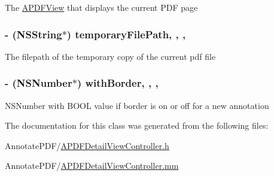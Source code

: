 The \hyperlink{interface_a_p_d_f_view}{A\-P\-D\-F\-View} that displays the current P\-D\-F page \hypertarget{interface_a_p_d_f_detail_view_controller_a7e73dd19df5ed6dedebde35c9901a164}{
\subsubsection[{temporary\-File\-Path}]{\setlength{\rightskip}{0pt plus 5cm}-\/ (N\-S\-String$\ast$) temporary\-File\-Path\hspace{0.3cm}{\ttfamily [read]}, {\ttfamily [write]}, {\ttfamily [nonatomic]}, {\ttfamily [retain]}}}\label{interface_a_p_d_f_detail_view_controller_a7e73dd19df5ed6dedebde35c9901a164}
The filepath of the temporary copy of the current pdf file \hypertarget{interface_a_p_d_f_detail_view_controller_a33508d1d7f1b1c686a4e5ab69f56a6de}{
\subsubsection[{with\-Border}]{\setlength{\rightskip}{0pt plus 5cm}-\/ (N\-S\-Number$\ast$) with\-Border\hspace{0.3cm}{\ttfamily [read]}, {\ttfamily [write]}, {\ttfamily [nonatomic]}, {\ttfamily [retain]}}}\label{interface_a_p_d_f_detail_view_controller_a33508d1d7f1b1c686a4e5ab69f56a6de}
N\-S\-Number with B\-O\-O\-L value if border is on or off for a new annotation 

The documentation for this class was generated from the following files\-:\begin{DoxyCompactItemize}
\item 
Annotate\-P\-D\-F/\hyperlink{_a_p_d_f_detail_view_controller_8h}{A\-P\-D\-F\-Detail\-View\-Controller.\-h}\item 
Annotate\-P\-D\-F/\hyperlink{_a_p_d_f_detail_view_controller_8mm}{A\-P\-D\-F\-Detail\-View\-Controller.\-mm}\end{DoxyCompactItemize}
